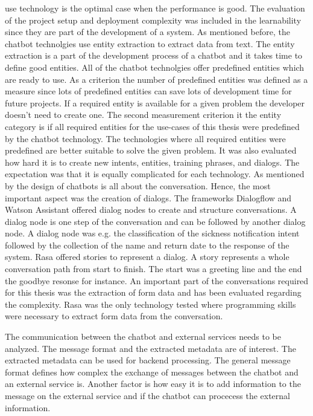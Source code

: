 use technology is the optimal case when the performance is good.
The evaluation of the project setup and deployment complexity was included in 
the learnability since they are part of the development of a system.
As mentioned before, the chatbot technolgies use entity extraction to 
extract data from text.
The entity extraction is a part of the development process of a chatbot
and it takes time to define good entities.
All of the chatbot technolgies offer predefined entities which are ready to use.
As a criterion the number of predefined entities was defined as a measure since 
lots of predefined entities can save lots of development time for future projects.
If a required entity is available for a given problem the developer doesn't need 
to create one.
The second measurement criterion it the entity category is if all required 
entities for the use-cases of this thesis were predefined by the chatbot technology.
The technologies where all required entities were predefined are better suitable 
to solve the given problem.
It was also evaluated how hard it is to create new intents, entities, training phrases,
and dialogs.
The expectation was that it is equally complicated for each technology.
As mentioned by \citet{folstad2017chatbots} the design of chatbots is all about the
conversation.
Hence, the most important aspect was the creation of dialogs.
The frameworks Dialogflow and Watson Assistant offered dialog nodes 
to create and structure conversations.
A dialog node is one step of the conversation and can be followed by another 
dialog node.
A dialog node was e.g. the classification of the sickness notification intent
followed by the collection of the name and return date to the response of the system.
Rasa offered stories to represent a dialog.
A story represents a whole conversation path from start to finish.
The start was a greeting line and the end the goodbye resonse for instance.
An important part of the conversations required for this thesis was the 
extraction of form data and has been evaluated regarding the 
complexity.
Rasa was the only technology tested where programming skills were necessary to
extract form data from the conversation. 







The communication between the chatbot and external services needs to be analyzed.
The message format and the extracted metadata are of interest.
The extracted metadata can be used for backend processing.
The general message format defines how complex the exchange of messages between the 
chatbot and an external service is.
Another factor is how easy it is to add information to the message on the 
external service and if the chatbot can procecess the external information.


